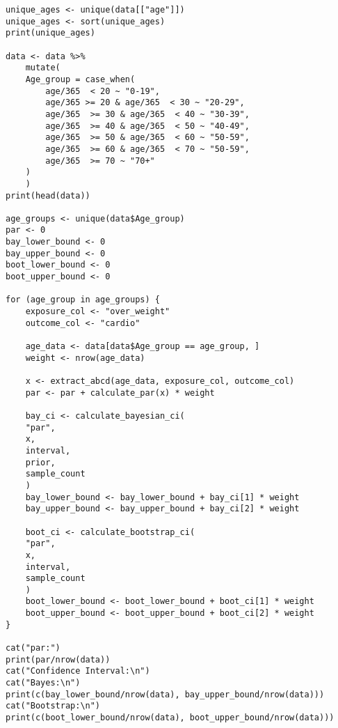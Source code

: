 \begin{lstlisting}
unique_ages <- unique(data[["age"]])
unique_ages <- sort(unique_ages)
print(unique_ages)

data <- data %>%
    mutate(
    Age_group = case_when(
        age/365  < 20 ~ "0-19",
        age/365 >= 20 & age/365  < 30 ~ "20-29",
        age/365  >= 30 & age/365  < 40 ~ "30-39",
        age/365  >= 40 & age/365  < 50 ~ "40-49",
        age/365  >= 50 & age/365  < 60 ~ "50-59",
        age/365  >= 60 & age/365  < 70 ~ "50-59",
        age/365  >= 70 ~ "70+"
    )
    )
print(head(data))

age_groups <- unique(data$Age_group)
par <- 0
bay_lower_bound <- 0
bay_upper_bound <- 0
boot_lower_bound <- 0
boot_upper_bound <- 0

for (age_group in age_groups) {
    exposure_col <- "over_weight"
    outcome_col <- "cardio"
    
    age_data <- data[data$Age_group == age_group, ]
    weight <- nrow(age_data)
    
    x <- extract_abcd(age_data, exposure_col, outcome_col)
    par <- par + calculate_par(x) * weight
    
    bay_ci <- calculate_bayesian_ci(
    "par",
    x,
    interval,
    prior,
    sample_count
    )
    bay_lower_bound <- bay_lower_bound + bay_ci[1] * weight
    bay_upper_bound <- bay_upper_bound + bay_ci[2] * weight
    
    boot_ci <- calculate_bootstrap_ci(
    "par",
    x,
    interval,
    sample_count
    )
    boot_lower_bound <- boot_lower_bound + boot_ci[1] * weight
    boot_upper_bound <- boot_upper_bound + boot_ci[2] * weight
}

cat("par:")
print(par/nrow(data))
cat("Confidence Interval:\n")
cat("Bayes:\n")
print(c(bay_lower_bound/nrow(data), bay_upper_bound/nrow(data)))
cat("Bootstrap:\n")
print(c(boot_lower_bound/nrow(data), boot_upper_bound/nrow(data)))
\end{lstlisting}


